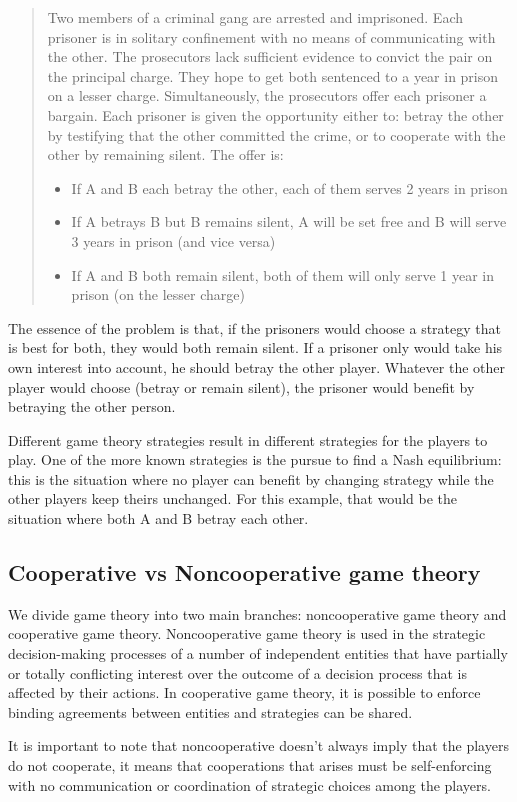 \begin{quote}
Two members of a criminal gang are arrested and imprisoned. Each prisoner is in solitary confinement with no means of communicating with the other. The prosecutors lack sufficient evidence to convict the pair on the principal charge. They hope to get both sentenced to a year in prison on a lesser charge. Simultaneously, the prosecutors offer each prisoner a bargain. Each prisoner is given the opportunity either to: betray the other by testifying that the other committed the crime, or to cooperate with the other by remaining silent. The offer is:
	\begin{itemize}
		\item If A and B each betray the other, each of them serves 2 years in prison
		\item If A betrays B but B remains silent, A will be set free and B will serve 3 years in prison (and vice versa)
		\item If A and B both remain silent, both of them will only serve 1 year in prison (on the lesser charge)
	\end{itemize}	
\end{quote}

The essence of the problem is that, if the prisoners would choose a strategy that is best for both, they would both remain silent. If a prisoner only would take his own interest into account, he should betray the other player. Whatever the other player would choose (betray or remain silent), the prisoner would benefit by betraying the other person.

Different game theory strategies result in different strategies for the players to play. One of the more known strategies is the pursue to find a Nash equilibrium: 
this is the situation where no player can benefit by changing strategy while the other players keep theirs unchanged. For this example, that would be the situation where both A and B betray each other.    

\subsection{Cooperative vs Noncooperative game theory}
We divide game theory into two main branches: noncooperative game theory and cooperative game theory. Noncooperative game theory is used in the strategic decision-making processes of a number of independent entities that have partially or totally conflicting interest over the outcome of a decision process that is affected by their actions.  In cooperative game theory, it is possible to enforce binding agreements between entities and strategies can be shared. 

It is important to note that noncooperative doesn't always imply that the players do not cooperate, it means that cooperations that arises must be self-enforcing with no communication or coordination of strategic choices among the players.   
